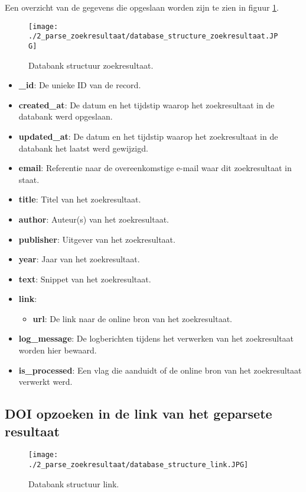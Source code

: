 Een overzicht van de gegevens die opgeslaan worden zijn te zien in figuur \ref{fig:databank_structuur_zoekresultaat}.
\begin{figure}
    \centering
    \texttt{[image: ./2\_parse\_zoekresultaat/database\_structure\_zoekresultaat.JPG]}
    \caption[Databank structuur zoekresultaat.]{\label{fig:databank_structuur_zoekresultaat}Databank structuur zoekresultaat.}
\end{figure}
\begin{itemize}
    \item \textbf{\_id}: De unieke ID van de record.
    \item \textbf{created\_at}: De datum en het tijdstip waarop het zoekresultaat in de databank werd opgeslaan.
    \item \textbf{updated\_at}: De datum en het tijdstip waarop het zoekresultaat in de databank het laatst werd gewijzigd. 
    \item \textbf{email}: Referentie naar de overeenkomstige e-mail waar dit zoekresultaat in staat.
    \item \textbf{title}: Titel van het zoekresultaat.
    \item \textbf{author}: Auteur(s) van het zoekresultaat. 
    \item \textbf{publisher}: Uitgever van het zoekresultaat.
    \item \textbf{year}: Jaar van het zoekresultaat.
    \item \textbf{text}: Snippet van het zoekresultaat.
    \item \textbf{link}: 
    \begin{itemize}
        \item \textbf{url}: De link naar de online bron van het zoekresultaat.
    \end{itemize}
    \item \textbf{log\_message}: De logberichten tijdens het verwerken van het zoekresultaat worden hier bewaard. 
    \item \textbf{is\_processed}: Een vlag die aanduidt of de online bron van het zoekresultaat verwerkt werd.
\end{itemize}

\FloatBarrier
\subsection{DOI opzoeken in de link van het geparsete resultaat}
\begin{figure}
    \centering
    \texttt{[image: ./2\_parse\_zoekresultaat/database\_structure\_link.JPG]}
    \caption[Databank structuur link.]{\label{fig:databank_structuur_link}Databank structuur link.}
\end{figure}


